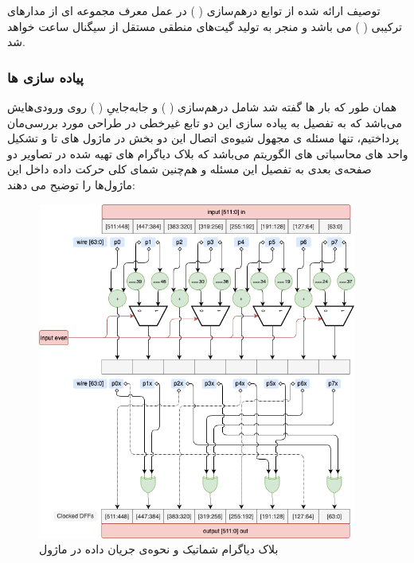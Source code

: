 توصیف ارائه شده از توابع درهم‌سازی (
) 
در عمل معرف مجموعه ای از مدار‌های ترکیبی (
) می باشد و منجر به تولید گیت‌های منطقی مستقل از سیگنال ساعت خواهد شد.

\subsubsection{
	پیاده سازی 
	ها
}
همان طور که بار ها گفته شد  شامل درهم‌سازی 
(
)
و
جابه‌جاییِ 
(
)
روی ورودی‌هایش می‌باشد که به تفصیل به پیاده سازی این دو تابع غیرخطی در طراحی مورد بررسی‌مان پرداختیم، تنها مسئله ی مجهول شیوه‌ی اتصال این دو بخش در ماژول های 
تا 
و تشکیل واحد های محاسباتی  های الگوریتم می‌باشد که بلاک دیاگرام های تهیه شده در تصاویر دو صفحه‌ی بعدی به تفصیل این مسئله و هم‌چنین شمای کلی حرکت داده داخل این ماژول‌ها را توضیح می دهند:
\begin{figure}[H]
	\centering
	\includegraphics[width=10.5cm]{images/diagrams_round1.png}	
	\caption{
	بلاک دیاگرام شماتیک و نحوه‌ی جریان داده در ماژول 
}
\end{figure}
